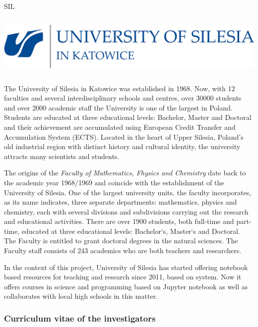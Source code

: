 \begin{sitedescription}{SIL}\label{desc:SIL}

\begin{center}
\includegraphics[height=3cm]{Participants/Logos/Silesia.png}
\end{center}

The University of Silesia in Katowice was established in 1968. Now,
with 12 faculties and several interdisciplinary schools and centres,
over 30000 students and over 2000 academic staff the University is one
of the largest in Poland. Students are educated at three educational
levels: Bachelor, Master and Doctoral and their achievement are
accumulated using European Credit Transfer and Accumulation System
(ECTS). Located in the heart of Upper Silesia, Poland's old industrial
region with distinct history and cultural identity, the university
attracts many scientists and students.

The origins of the {\em Faculty of Mathematics, Fhysics and Chemistry} date
back to the academic year 1968/1969 and coincide with the
establishment of the University of Silesia. One of the largest
university units, the faculty incorporates, as its name indicates,
three separate departments: mathematics, physics and chemistry, each
with several divisions and subdivisions carrying out the research and
educational activities. There are over 1900 students, both full-time
and part-time, educated at three educational levels: Bachelor`s,
Master`s and Doctoral. The Faculty is entitled to grant doctoral
degrees in the natural sciences. The Faculty staff consists of 243
academics who are both teachers and researchers.


In the context of this project, University of Silesia has started offering notebook based resources for teaching and research since 2011, based on \Sage system. Now it offers courses in science and programming based on Jupyter notebook as well as collaborates with local high schools in this matter. 


\subsubsection*{Curriculum vitae of the investigators}


\end{sitedescription}
